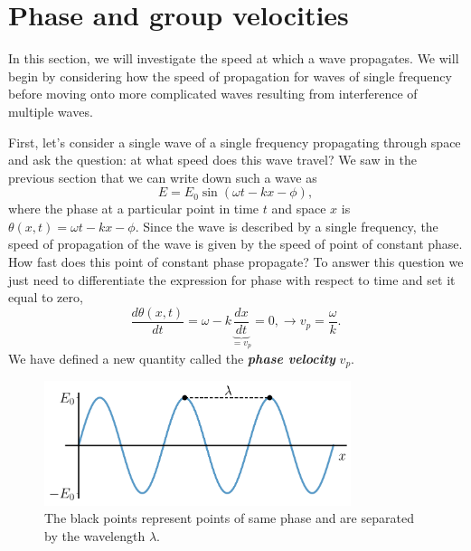 \section{Phase and group velocities}
\label{sec:6-2_phase_group_velocity}

In this section, we will investigate the speed at which a wave propagates.
We will begin by considering how the speed of propagation for waves of single frequency before moving onto more complicated waves resulting from interference of multiple waves.

First, let's consider a single wave of a single frequency propagating through space and ask the question: at what speed does this wave travel?
We saw in the previous section that we can write down such a wave as
\begin{equation}
    E = E_{0} \sin (\omega t-k x-\phi),
\end{equation}
where the phase at a particular point in time $t$ and space $x$ is $\theta(x,t)=\omega t-k x-\phi$.
Since the wave is described by a single frequency, the speed of propagation of the wave is given by the speed of point of constant phase.
How fast does this point of constant phase propagate?
To answer this question we just need to differentiate the expression for phase with respect to time and set it equal to zero,
\begin{equation}
    \frac{d\theta(x,t)}{d t} = \omega - k \underbrace{\frac{dx}{dt}}_{= v_p} = 0, \longrightarrow v_p = \frac{\omega}{k}.
    \label{eq:6-2_phase_velocity}
\end{equation}
We have defined a new quantity called the \textit{\textbf{phase velocity}} $v_p$.

\begin{figure}[t]
   \centering
    \includegraphics[width=0.8\textwidth]{lesson6/6-2_phase_velocity.pdf}    
        \caption[Phase velocity]{The black points represent points of same phase and are separated by the wavelength $\lambda$.}
        \label{fig:6-2_phase_velocity}
\end{figure}

